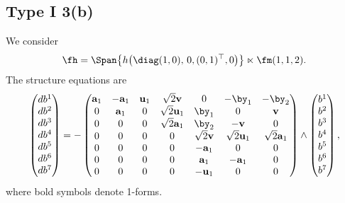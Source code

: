 \subsection{Type I 3(b)}
We consider
\begin{gather*}\fh=\Span\big\{ h\big(\diag(1,0),\, 0,(0,1)^\top,0\big) \big\}\ltimes\fm(1,1,2).\end{gather*}
The structure equations are
\begin{gather}\label{EI3(b)}\left(\begin{matrix} db^1\\db^2\\db^3\\db^4\\db^5\\db^6\\db^7\end{matrix}\right) = -\left(
\begin{matrix}
{\bf a}_1&- {\bf a}_1&{\bf u}_1&\sqrt{2} {\bf v}&0&-\by_1&-\by_2\\
0&{\bf a}_1&0&\sqrt{2} {\bf u}_1&\by_1&0&{\bf v}\\
0&0&0& \sqrt{2} {\bf a}_1&\by_2&-{\bf v}&0\\
0&0&0&0&\sqrt{2} {\bf v}&\sqrt{2} {\bf u}_1&\sqrt 2 {\bf a}_1\\
0&0&0&0&-{\bf a}_1&0&0\\
0&0&0&0&{\bf a}_1&-{\bf a}_1&0\\
0&0&0&0&-{\bf u}_1&0&0
\end{matrix}\right) \wedge \left(\begin{matrix} b^1\\b^2\\b^3\\b^4\\b^5\\b^6\\b^7\end{matrix}\right),
\end{gather}
where bold symbols denote 1-forms.
